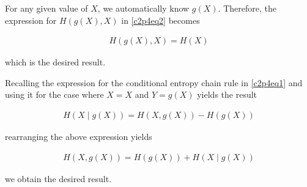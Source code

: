 \documentclass[ClusteringConnectionsMAIN.tex]{subfiles}
\begin{document}
	
	
  For any given value of $X$, we automatically know $g \left( X \right)$.  Therefore, the expression for $H \left( g \left( X \right), X \right)$ in \ref{c2p4eq2} becomes

\begin{align*} 
H \left( g \left( X \right), X \right) = H \left( X \right)  
\end{align*}

which is the desired result.



\vspace{0.5in}

  Recalling the expression for the conditional entropy chain rule in \ref{c2p4eq1} and using it for the case where $X = X$ and $Y = g \left( X \right)$ yields the result

\begin{align*} 
H \left( X \mid g \left( X \right) \right) = H \left( X, g \left( X \right) \right) - H \left( g \left( X \right) \right)  
\end{align*}

rearranging the above expression yields 

\begin{align} \label{c2p4eq3}
H \left( X, g \left( X \right) \right) = H \left( g \left( X \right) \right) + H \left( X \mid g \left( X \right) \right)  \tag{2.4-3}
\end{align}

we obtain the desired result.
\end{document}
